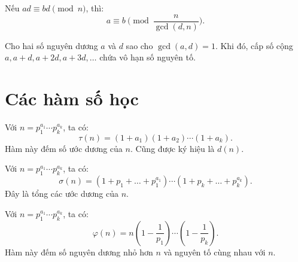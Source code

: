 \documentclass[../imo-training-open-book.tex]{subfiles}
\begin{document}
\vspace{1em}

\begin{theorem*}
    \label{theorem:cancel-modulo}
    Nếu \( ad \equiv bd \pmod{n} \), thì:
    \[
        a \equiv b \pmod{\frac{n}{\gcd(d,n)}}.
    \]
\end{theorem*}

\begin{theorem}
    \label{theorem:dirichlet-ap}
    Cho hai số nguyên dương \( a \) và \( d \) sao cho \(\gcd(a,d) = 1\). Khi đó, cấp số cộng \( a, a+d, a+2d, a+3d, \ldots \) chứa vô hạn số nguyên tố.
\end{theorem}

\newpage

\section{Các hàm số học}

\begin{definition*}
    \label{definition:tau-function}
    Với \( n = p_1^{a_1} \cdots p_k^{a_k} \), ta có:
    \[
        \tau(n) = (1 + a_1)(1 + a_2) \cdots (1 + a_k).
    \]
    Hàm này đếm số ước dương của \( n \). Cũng được ký hiệu là \( d(n) \).
\end{definition*}

\vspace{1em}

\begin{definition*}
    \label{definition:sigma-function}
    Với \( n = p_1^{a_1} \cdots p_k^{a_k} \), ta có:
    \[
        \sigma(n) = \left(1 + p_1 + \dots + p_1^{a_1}\right) \cdots \left(1 + p_k + \dots + p_k^{a_k}\right).
    \]
    Đây là tổng các ước dương của \( n \).
\end{definition*}

\vspace{1em}

\begin{definition*}
    \label{definition:euler-totient}
    Với \( n = p_1^{a_1} \cdots p_k^{a_k} \), ta có:
    \[
        \varphi(n) = n\left(1 - \frac{1}{p_1}\right) \cdots \left(1 - \frac{1}{p_k}\right).
    \]
    Hàm này đếm số nguyên dương nhỏ hơn \( n \) và nguyên tố cùng nhau với \( n \).
\end{definition*}
\end{document}
